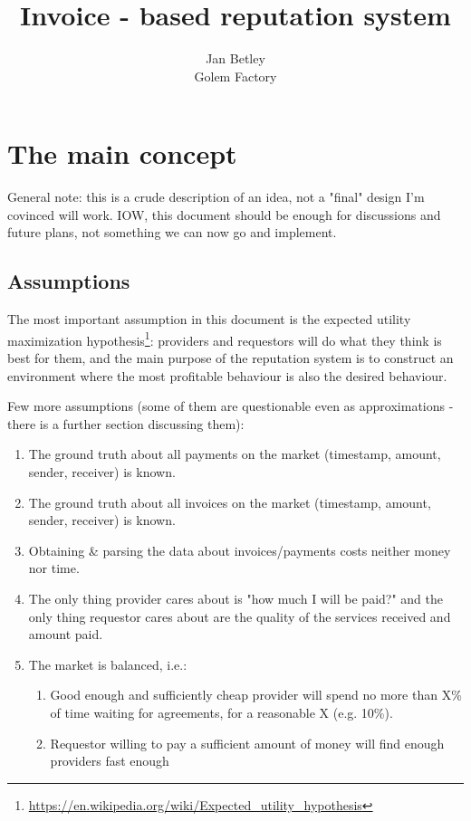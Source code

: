 \documentclass{article}
\title{Invoice - based reputation system}
\author{Jan Betley\\ Golem Factory}
\begin{document}
\maketitle

\section{The main concept}

General note: this is a crude description of an idea, not a "final" design I'm covinced will work.
IOW, this document should be enough for discussions and future plans, not something we can now go and implement.

\subsection{Assumptions}

The most important assumption in this document is the expected utility maximization hypothesis\footnote{
\href{https://en.wikipedia.org/wiki/Expected\_utility\_hypothesis}
     {https://en.wikipedia.org/wiki/Expected\_utility\_hypothesis}
}: providers and requestors will do what they think is best for them, and the main purpose of the reputation system
is to construct an environment where the most profitable behaviour is also the desired behaviour.
    
Few more assumptions (some of them are questionable even as approximations - there is a further section discussing them):

\begin{enumerate}
    \item The ground truth about all payments on the market (timestamp, amount, sender, receiver) is known.
    \item The ground truth about all invoices on the market (timestamp, amount, sender, receiver) is known.
    \item Obtaining \& parsing the data about invoices/payments costs neither money nor time.
    \item The only thing provider cares about is "how much I will be paid?" and the only thing requestor cares about
        are the quality of the services received and amount paid.
    \item The market is balanced, i.e.: 
        \begin{enumerate}
            \item Good enough and sufficiently cheap provider will spend no more than X\% of time waiting for agreements, for a reasonable X (e.g. 10\%).
            \item Requestor willing to pay a sufficient amount of money will find enough providers fast enough
        \end{enumerate}
\end{enumerate}
\end{document}
